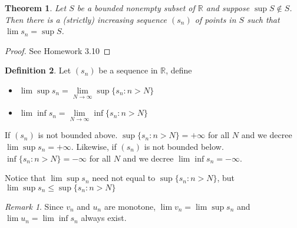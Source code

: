 \documentclass[12pt, lettersize]{book}
\theoremstyle{plain}
\newtheorem{thm}{Theorem}[section]
\theoremstyle{definition}
\newtheorem{dfn}[thm]{Definition}
\theoremstyle{remark}
\newtheorem*{rem}{Remark}
\newcommand{\R}{\mathbb{R}}
\begin{document}
		\begin{thm}
		Let $S$ be a bounded nonempty subset of $\R$ and suppose $\sup S\notin S$. Then there is a (strictly) increasing sequence $(s_n)$ of points in $S$ such that $\lim s_n=\sup S$.
		\end{thm}
		\begin{proof}
			See Homework 3.10
		\end{proof}
		
		\begin{dfn}
		Let $(s_n)$ be a sequence in $\mathbb{R}$, define
		\begin{itemize}
			\item $\lim\sup s_n=\lim\limits_{N\rightarrow\infty}\sup\{s_n: n>N\}$
			\item $\lim\inf s_n=\lim\limits_{N\rightarrow\infty}\inf\{s_n: n>N\}$
		\end{itemize}
		\end{dfn}
		If $(s_n)$ is not bounded above. $\sup\{s_n: n>N\}=+\infty$ for all $N$ and we decree $\lim\sup s_n=+\infty$.
		Likewise, if $(s_n)$ is not bounded below. $\inf\{s_n: n>N\}=-\infty$ for all $N$ and we decree $\lim\inf s_n=-\infty$.
		
		Notice that $\lim\sup s_n$ need not equal to $\sup\{s_n: n>N\}$, but $\lim\sup s_n\leq\sup\{s_n: n>N\}$
		\begin{rem}
			Since $v_n$ and $u_n$ are monotone, $\lim v_n=\lim\sup s_n$ and $\lim u_n=\lim\inf s_n$ always exist.
		\end{rem}
		
\end{document}
